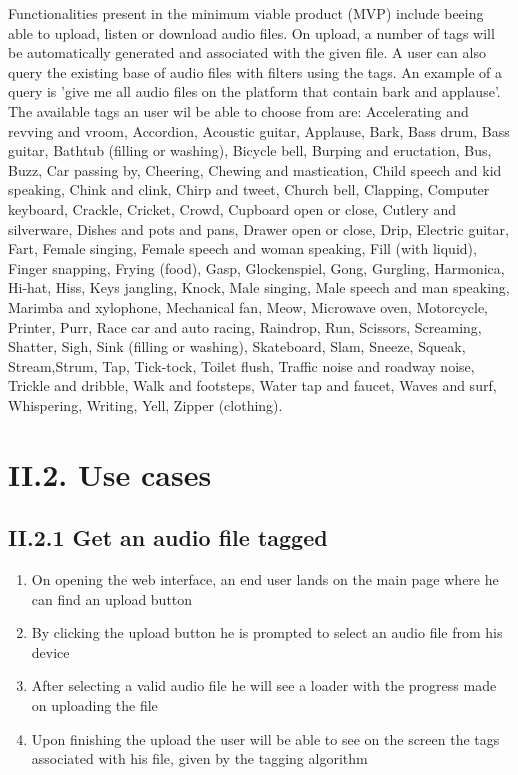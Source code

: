 \documentclass[11pt, a4papper]{report}
\theoremstyle{plain}
\theoremstyle{definition}
\theoremstyle{definition}
\theoremstyle{proposition}
\begin{document}
Functionalities present in the minimum viable product (MVP) include beeing able to upload, listen or download audio files. On upload, a number of tags will be automatically generated and associated with the given file. A user can also query the existing base of audio files with filters using the tags. An example of a query is 'give me all audio files on the platform that contain bark and applause'. The available tags an user wil be able to choose from are: Accelerating and revving and vroom, Accordion, Acoustic guitar, Applause, Bark, Bass drum, Bass guitar, Bathtub (filling or washing), Bicycle bell, Burping and eructation, Bus, Buzz, Car passing by, Cheering, Chewing and mastication, Child speech and kid speaking, Chink and clink, Chirp and tweet, Church bell, Clapping, Computer keyboard, Crackle, Cricket, Crowd, Cupboard open or close, Cutlery and silverware, Dishes and pots and pans, Drawer open or close, Drip, Electric guitar, Fart, Female singing, Female speech and woman speaking, Fill (with liquid), Finger snapping, Frying (food), Gasp, Glockenspiel, Gong, Gurgling, Harmonica, Hi-hat, Hiss, Keys jangling, Knock, Male singing, Male speech and man speaking, Marimba and xylophone, Mechanical fan, Meow, Microwave oven, Motorcycle, Printer, Purr, Race car and auto racing, Raindrop, Run, Scissors, Screaming, Shatter, Sigh, Sink (filling or washing), Skateboard, Slam, Sneeze, Squeak, Stream,Strum, Tap, Tick-tock, Toilet flush, Traffic noise and roadway noise, Trickle and dribble, Walk and footsteps, Water tap and faucet, Waves and surf, Whispering, Writing, Yell, Zipper (clothing).


\section*{II.2. Use cases}

\subsection*{II.2.1 Get an audio file tagged}

\begin{enumerate}
	\item{On opening the web interface, an end user lands on the main page where he can find an upload button}
	\item{By clicking the upload button he is prompted to select an audio file from his device}
	\item{After selecting a valid audio file he will see a loader with the progress made on uploading the file}
	\item{Upon finishing the upload the user will be able to see on the screen the tags associated with his file, given by the tagging algorithm}
\end{enumerate}
\end{document}
